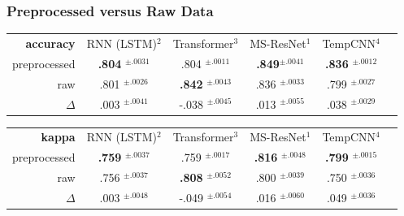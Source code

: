 \begin{frame}
\frametitle{Preprocessed versus Raw Data}

%
{
\centering

\begin{tabular}{rccccc}
	\toprule
	\textbf{accuracy} & RNN (LSTM)$^2$ & Transformer$^3$ & MS-ResNet$^1$ & TempCNN$^4$ \\
	\cmidrule(lr){2-2}\cmidrule(lr){3-3} \cmidrule(lr){4-4}\cmidrule(lr){5-5}
	preprocessed & \textbf{.804} $^{\pm.0031}$ & .804 $^{\pm.0011}$ & \textbf{.849}$^{\pm .0041}$ & \textbf{.836} $^{\pm .0012}$ \\
	raw & .801 $^{\pm .0026}$ & \textbf{.842} $^{\pm .0043}$ & {.836} $^{\pm .0033}$ & .799 $^{\pm .0027}$ \\
	\midrule
	$\Delta$ & .003 $^{\pm .0041}$ & -.038 $^{\pm .0045}$ & .013 $^{\pm .0055}$ & .038 $^{\pm .0029}$ \\
	
	\bottomrule
\end{tabular}
\vspace{1em}

\begin{tabular}{rccccc}
	\toprule
	\textbf{kappa} & RNN (LSTM)$^2$ & Transformer$^3$ & MS-ResNet$^1$ & TempCNN$^4$ \\
	\cmidrule(lr){2-2}\cmidrule(lr){3-3} \cmidrule(lr){4-4}\cmidrule(lr){5-5}
	preprocessed & \textbf{.759} $^{\pm .0037}$ & .759 $^{\pm .0017}$ & \textbf{.816} $^{\pm .0048}$ & \textbf{.799} $^{\pm .0015}$ \\
	raw & .756 $^{\pm .0037}$ & \textbf{.808} $^{\pm .0052}$ & .800 $^{\pm .0039}$ & .750 $^{\pm .0036}$ \\
	\midrule
	$\Delta$ & .003 $^{\pm .0048}$ & -.049 $^{\pm .0054}$ & .016 $^{\pm .0060}$ & .049 $^{\pm .0036}$ \\
	

\end{tabular}}
\end{frame}
